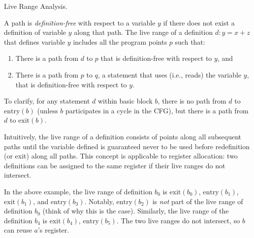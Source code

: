 \begin{problem}
	Live Range Analysis.
	
	\item A path is \emph{definition-free} with respect to a variable $y$ if
	there does not exist a definition of variable $y$ along that path.
	The live range of a definition $d\colon y = x + z$ that defines variable $y$ includes all the program points $p$ such that:
	\begin{enumerate}
		\item There is a path from $d$ to $p$ that is definition-free with respect to $y$, and
		\item There is a path from $p$ to $q$, a statement that uses (i.e., reads) the variable $y$, that is definition-free with respect to $y$.
	\end{enumerate}
	To clarify, for any statement $d$ within basic block $b$, there is no path from $d$ to $\mathrm{entry}(b)$ (unless $b$ participates in a cycle in the CFG), but there is a path from $d$ to $\mathrm{exit}(b)$.
	
	Intuitively, the live range of a definition consists of points along all subsequent paths until the variable defined is guaranteed never to be used before redefinition (or exit) along all paths. This concept is applicable to register allocation: two definitions can be assigned to the same register if their live ranges do not intersect.
	
	\begin{center}
	\end{center}
	In the above example, the live range of definition $b_0$ is $\mathrm{exit}(b_0)$,
	$\mathrm{entry}(b_1)$, $\mathrm{exit}(b_1)$, and $\mathrm{entry}(b_3)$. Notably, $\mathrm{entry}(b_2)$ is \emph{not} part of the live range of definition $b_0$ (think of why this is the case). Similarly, the live range
	of the definition $b_4$ is $\mathrm{exit}(b_4)$, $\mathrm{entry}(b_5)$. The two
	live ranges do not intersect, so $b$ can reuse $a$'s register.
	

\end{problem}
